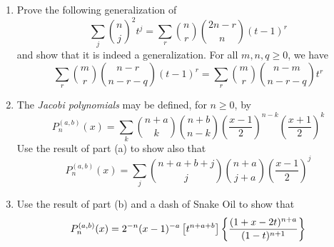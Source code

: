 \begin{exercise}
    \begin{enumerate}[label=(\alph*)]
        \item Prove the following generalization of 
        \[
            \sum_j \binom{n}{j}^2 t^j = \sum_r \binom{n}{r}\binom{2n-r}{n} (t-1)^r
        \]
        and show that it is indeed a generalization. For all $m,n,q\geq0$, we have 
        \[
            \sum_r \binom{m}{r}\binom{n-r}{n-r-q}(t-1)^r = \sum_r \binom{m}{r}\binom{n-m}{n-r-q}t^r
        \]
        \item The \emph{Jacobi polynomials} may be defined, for $n\geq0$, by 
        \[
            P_n^{(a,b)}(x) = \sum_k \binom{n+a}{k} \binom{n+b}{n-k}\left(\frac{x-1}{2}\right)^{n-k}\left(\frac{x+1}{2}\right)^k
        \]
        Use the result of part (a) to show also that
        \[
            P_n^{(a,b)}(x) = \sum_j \binom{n+a+b+j}{j}\binom{n+a}{j+a}\left(\frac{x-1}{2}\right)^j
        \]
        \item Use the result of part (b) and a dash of Snake Oil to show that
        \[
            P_n^{(a,b)}(x) = 2^{-n}(x-1)^{-a}\left[t^{n+a+b}\right]\left\{ \frac{(1+x-2t)^{n+a}}{(1-t)^{n+1}}\right\}
        \]
    \end{enumerate}
\end{exercise}
